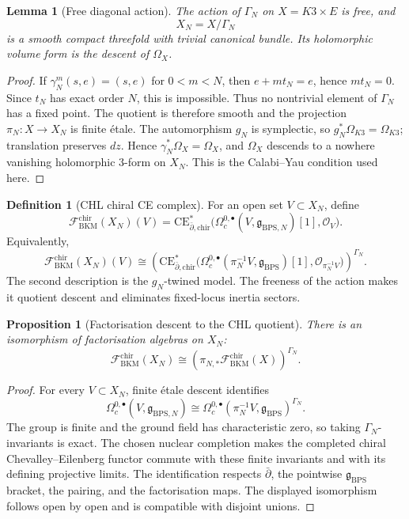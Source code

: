 \documentclass[11pt]{amsart}
\providecommand{\dbar}{\bar{\partial}}
\providecommand{\gBPS}{\mathfrak{g}_{\mathrm{BPS}}}
\providecommand{\gBPSN}{\mathfrak{g}_{\mathrm{BPS},N}}
\providecommand{\CE}{\mathrm{CE}}
\providecommand{\chir}{\mathrm{chir}}
\providecommand{\cF}{\mathcal{F}}
\providecommand{\cO}{\mathcal{O}}
\theoremstyle{plain}
\newtheorem{proposition}[theorem]{Proposition}
\newtheorem{lemma}[theorem]{Lemma}
\theoremstyle{definition}
\newtheorem{definition}[theorem]{Definition}
\theoremstyle{remark}
\begin{document}
\begin{lemma}[Free diagonal action]\label{lem:free-diagonal-action}
The action of $\Gamma_N$ on $X=K3\times E$ is free, and
\[
 X_N=X/\Gamma_N
\]
is a smooth compact threefold with trivial canonical bundle. Its
holomorphic volume form is the descent of $\Omega_X$.
\end{lemma}

\begin{proof}
If $\gamma_N^m(s,e)=(s,e)$ for $0<m<N$, then $e+mt_N=e$, hence
$mt_N=0$. Since $t_N$ has exact order $N$, this is impossible. Thus no
nontrivial element of $\Gamma_N$ has a fixed point. The quotient is
therefore smooth and the projection $\pi_N:X\to X_N$ is finite
\'etale. The automorphism $g_N$ is symplectic, so $g_N^*\Omega_{K3}
=\Omega_{K3}$; translation preserves $dz$. Hence
$\gamma_N^*\Omega_X=\Omega_X$, and $\Omega_X$ descends to a nowhere
vanishing holomorphic $3$-form on $X_N$. This is the Calabi--Yau
condition used here.
\end{proof}

\begin{definition}[CHL chiral CE complex]\label{def:chl-ce}
For an open set $V\subset X_N$, define
\[
 \cF^{\chir}_{\mathrm{BKM}}(X_N)(V)
 =
 \CE^*_{\dbar,\chir}
 \bigl(\Omega_c^{0,\bullet}(V,\gBPSN)[1],\cO_V\bigr).
\]
Equivalently,
\[
 \cF^{\chir}_{\mathrm{BKM}}(X_N)(V)
 \cong
 \left(
 \CE^*_{\dbar,\chir}
 \bigl(\Omega_c^{0,\bullet}(\pi_N^{-1}V,\gBPS)[1],
 \cO_{\pi_N^{-1}V}\bigr)
 \right)^{\Gamma_N}.
\]
The second description is the $g_N$-twined model. The freeness of the
action makes it quotient descent and eliminates fixed-locus inertia
sectors.
\end{definition}

\begin{proposition}[Factorisation descent to the CHL quotient]\label{prop:chl-descent}
There is an isomorphism of factorisation algebras on $X_N$:
\[
 \cF^{\chir}_{\mathrm{BKM}}(X_N)
 \cong
 \left(\pi_{N,*}\cF^{\chir}_{\mathrm{BKM}}(X)\right)^{\Gamma_N}.
\]
\end{proposition}

\begin{proof}
For every $V\subset X_N$, finite \'etale descent identifies
\[
 \Omega_c^{0,\bullet}(V,\gBPSN)
 \cong
 \Omega_c^{0,\bullet}(\pi_N^{-1}V,\gBPS)^{\Gamma_N}.
\]
The group is finite and the ground field has characteristic zero, so
taking $\Gamma_N$-invariants is exact. The chosen nuclear completion
makes the completed chiral Chevalley--Eilenberg functor commute with
these finite invariants and with its defining projective limits. The
identification respects $\dbar$, the pointwise $\gBPS$ bracket, the
pairing, and the factorisation maps. The displayed isomorphism follows
open by open and is compatible with disjoint unions.
\end{proof}
\end{document}
